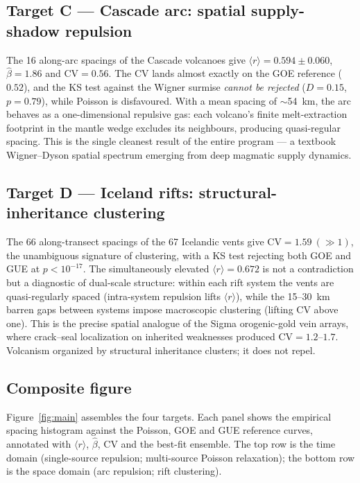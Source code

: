 \documentclass[11pt]{article}
\begin{document}
\subsection{Target C --- Cascade arc: spatial supply-shadow repulsion}
The 16 along-arc spacings of the Cascade volcanoes give
$\langle r\rangle=0.594\pm0.060$, $\hat\beta=1.86$ and $\mathrm{CV}=0.56$. The
CV lands almost exactly on the GOE reference ($0.52$), and the KS test against
the Wigner surmise \emph{cannot be rejected} ($D=0.15$, $p=0.79$), while Poisson
is disfavoured. With a mean spacing of $\sim$54~km, the arc behaves as a
one-dimensional repulsive gas: each volcano's finite melt-extraction footprint
in the mantle wedge excludes its neighbours, producing quasi-regular spacing.
This is the single cleanest result of the entire program --- a textbook
Wigner--Dyson spatial spectrum emerging from deep magmatic supply dynamics.

\subsection{Target D --- Iceland rifts: structural-inheritance clustering}
The 66 along-transect spacings of the 67 Icelandic vents give
$\mathrm{CV}=1.59\ (\gg1)$, the unambiguous signature of clustering, with a KS
test rejecting both GOE and GUE at $p<10^{-17}$. The simultaneously elevated
$\langle r\rangle=0.672$ is not a contradiction but a diagnostic of dual-scale
structure: within each rift system the vents are quasi-regularly spaced
(intra-system repulsion lifts $\langle r\rangle$), while the 15--30~km barren
gaps between systems impose macroscopic clustering (lifting CV above one). This
is the precise spatial analogue of the Sigma orogenic-gold vein arrays, where
crack--seal localization on inherited weaknesses produced $\mathrm{CV}=1.2$--$1.7$.
Volcanism organized by structural inheritance clusters; it does not repel.

\subsection{Composite figure}
Figure~\ref{fig:main} assembles the four targets. Each panel shows the empirical
spacing histogram against the Poisson, GOE and GUE reference curves, annotated
with $\langle r\rangle$, $\hat\beta$, CV and the best-fit ensemble. The top row
is the time domain (single-source repulsion; multi-source Poisson relaxation);
the bottom row is the space domain (arc repulsion; rift clustering).
\end{document}
